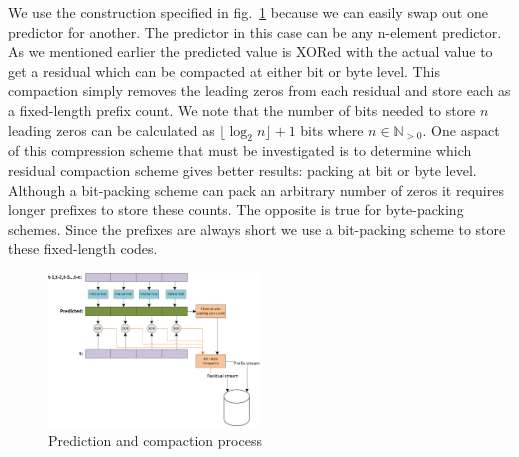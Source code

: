 \documentclass{acm_proc_article-sp}
\begin{document}
We use the construction specified in fig.~\ref{PACKING_ALGORITHM} because we can easily swap out one predictor for another. The predictor in this case can be any n-element predictor. As we mentioned
earlier the predicted value is XORed with the actual value to get a residual which can be compacted at either bit or byte level. This compaction simply removes the leading zeros from each residual and
store each as a fixed-length prefix count. We note that the number of bits needed to store $n$ leading zeros can be calculated as $\lfloor\log_2n\rfloor+1$ bits where $n\in\mathbb{N}_{>0}$. One aspact 
of this compression scheme that must be investigated is to determine which residual compaction scheme gives better results: packing at bit or byte level. Although a bit-packing scheme can pack
an arbitrary number of zeros it requires longer prefixes to store these counts. The opposite is true for byte-packing schemes. Since the prefixes are always short we use a bit-packing scheme to store
these fixed-length codes.
\begin{figure}[h!]
 \centering
 \includegraphics[width=0.50\textwidth]{Thesis_Alg.png}
 \caption{Prediction and compaction process}
 \label{PACKING_ALGORITHM}
\end{figure}
\end{document}

